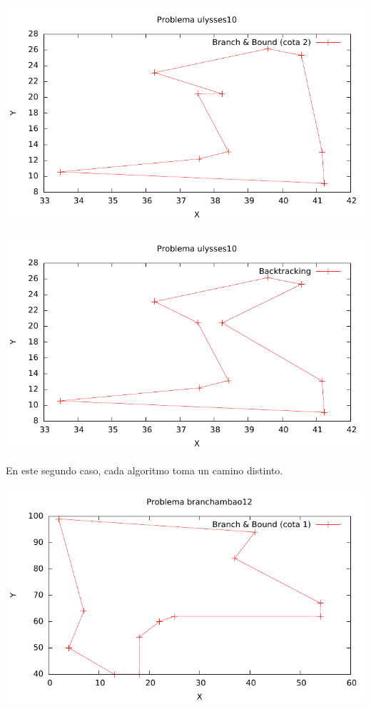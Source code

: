 \includegraphics[width=15cm]{img/ulysses10_tsp_2}

\includegraphics[width=15cm]{img/ulysses10_tsp_3}

En este segundo caso, cada algoritmo toma un camino distinto.

\includegraphics[width=15cm]{img/branchambao12_tsp_1}


